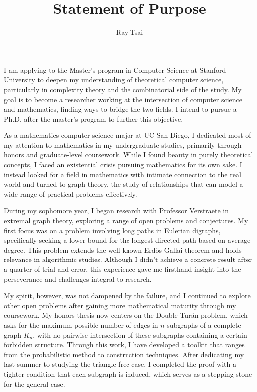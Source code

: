 \documentclass[12pt]{article}
\title{Statement of Purpose}
\author{Ray Tsai}
\date{}
\begin{document}
\maketitle

\vspace{-0.25in}

I am applying to the Master's program in Computer Science at Stanford University to deepen my
understanding of theoretical computer science, particularly in complexity theory and the
combinatorial side of the study. My goal is to become a researcher working at the intersection of
computer science and mathematics, finding ways to bridge the two fields. I intend to pursue a Ph.D.
after the master's program to further this objective.

As a mathematics-computer science major at UC San Diego, I dedicated most of my attention to
mathematics in my undergraduate studies, primarily through honors and graduate-level coursework.
While I found beauty in purely theoretical concepts, I faced an existential crisis pursuing
mathematics for its own sake. I instead looked for a field in mathematics with intimate connection
to the real world and turned to graph theory, the study of relationships that can model a wide range
of practical problems effectively.

During my sophomore year, I began research with Professor Verstraete in extremal graph theory,
exploring a range of open problems and conjectures. My first focus was on a problem involving long
paths in Eulerian digraphs, specifically seeking a lower bound for the longest directed path based
on average degree. This problem extends the well-known Erdős-Gallai theorem and holds relevance in
algorithmic studies. Although I didn't achieve a concrete result after a quarter of trial and error,
this experience gave me firsthand insight into the perseverance and challenges integral to research.

My spirit, however, was not dampened by the failure, and I continued to explore other open problems
after gaining more mathematical maturity through my coursework. My honors thesis now centers on the
Double Turán problem, which asks for the maximum possible number of edges in $n$ subgraphs of a
complete graph $K_n$, with no pairwise intersection of these subgraphs containing a certain
forbidden structure. Through this work, I have developed a toolkit that ranges from the
probabilistic method to construction techniques. After dedicating my last summer to studying the
triangle-free case, I completed the proof with a tighter condition that each subgraph is induced,
which serves as a stepping stone for the general case. 
\end{document}
